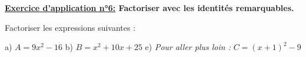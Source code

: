 \documentclass[12pt]{article}
\begin{document}
\begin{mdframed}[
    linewidth=1pt,
    roundcorner=5pt,
    linecolor=RoyalBlue,
    innertopmargin=10pt,
    innerbottommargin=10pt
]
{\color{RoyalBlue}
\textbf{\underline{Exercice d'application n°6:} Factoriser avec les identités remarquables.}}

\vspace{5pt}
Factoriser les expressions suivantes :

\vspace{5pt}
\hspace{1cm}a) $A = 9x^2 - 16$ \hspace{1cm}b) $B = x^2 + 10x + 25$ \hspace{1cm}e) \textit{Pour aller plus loin :} $C = (x+1)^2 - 9$

\vspace{0.5cm}
{\color{black!45}\dotfill}

\vspace{0.5cm}
{\color{black!45}\dotfill}

\vspace{0.5cm}
{\color{black!45}\dotfill}

\vspace{0.5cm}
{\color{black!45}\dotfill}

\vspace{0.5cm}
{\color{black!45}\dotfill}

\vspace{10pt}

\end{mdframed}
\end{document}
